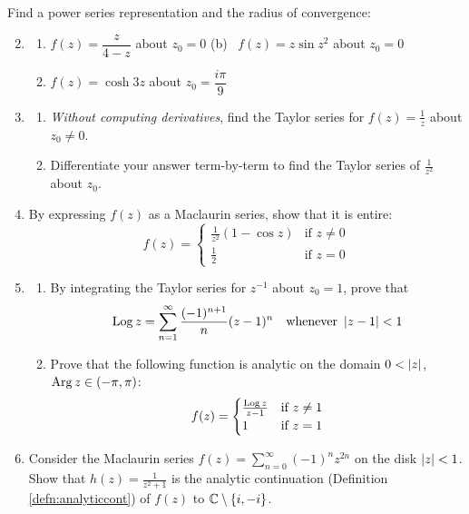 \begin{exercises}
	\exstart Find a power series representation and the radius of convergence:
	\begin{enumerate}\setcounter{enumi}{1}
	  \item[]\begin{enumerate}
	    \item $f(z)=\dfrac z{4-z}$ about $z_0=0$
	    \qquad\qquad
	    (b) \ $f(z)=z\sin z^2$ about $z_0=0$
	    \setcounter{enumii}{2}
	    \item $f(z)=\cosh 3z$ about $z_0=\dfrac{i\pi}9$
		\end{enumerate}
		
		
		\item\begin{enumerate}
		  \item \emph{Without computing derivatives}, find the Taylor series for $f(z)=\frac 1z$ about $z_0\neq 0$.
		  \item Differentiate your answer term-by-term to find the Taylor series of $\frac 1{z^2}$ about $z_0$.
		\end{enumerate} 
		
		
		\item By expressing $f(z)$ as a Maclaurin series, show that it is entire:
		\[
			f(z)=
			\begin{cases} 
				\frac 1{z^2}(1-\cos z)&\text{if }z\neq 0\\
				\frac 12&\text{if }z=0
			\end{cases}
		\]
		
		
		\item\begin{enumerate}
		  \item By integrating the Taylor series for $z^{-1}$ about $z_0=1$, prove that 
		  \[
		  	\operatorname{Log} z=\sum_{n=1}^\infty\frac{(-1)^{n+1}}n(z-1)^n
		  	\quad\text{whenever }\left| z-1\right|<1
		  \]
		  \item Prove that the following function is analytic on the domain $0<\left| z\right|$, \ $\operatorname{Arg} z\in(-\pi,\pi)$:
		  \[
		  	f(z)=
		  	\begin{cases} 
					\frac{\operatorname{Log} z}{z-1}&\text{if }z\neq 1\\
					1&\text{if }z=1
				\end{cases}
			\]
		\end{enumerate}
		
		
		\item Consider the Maclaurin series $f(z)=\sum_{n=0}^\infty (-1)^nz^{2n}$ on the disk $\left| z\right|<1$. Show that $h(z)=\frac 1{z^2+1}$ is the analytic continuation (Definition \ref{defn:analyticcont}) of $f(z)$ to $\mathbb{C}\setminus\{i,-i\}$. 
		

\end{enumerate}
\end{exercises}
